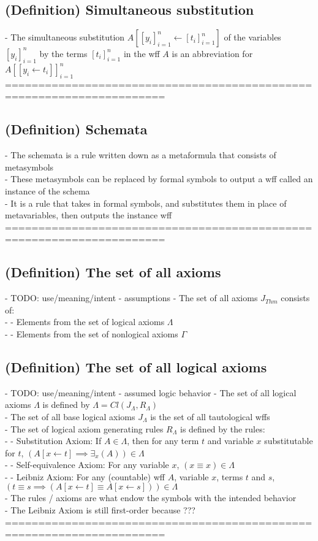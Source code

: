 \documentclass{article}
\begin{document}
\subsection{(Definition) Simultaneous substitution}
	- The simultaneous substitution $A[[y_i]_{i=1}^n \leftarrow [t_i]_{i=1}^n]$ of the variables $[y_i]_{i=1}^n$ by the terms $[t_i]_{i=1}^n$ in the wff $A$ is an abbreviation for $A[[y_i \leftarrow t_i]]_{i=1}^n$ \\
	======================================================================
\subsection{(Definition) Schemata}
	- The schemata is a rule written down as a metaformula that consists of metasymbols \\
	- These metasymbols can be replaced by formal symbols to output a wff called an instance of the schema \\
		- It is a rule that takes in formal symbols, and substitutes them in place of metavariables, then outputs the instance wff \\
	======================================================================
\subsection{(Definition) The set of all axioms}
	- TODO: use/meaning/intent - assumptions
	- The set of all axioms $J_{Thm}$ consists of: \\
		- - Elements from the set of logical axioms $\Lambda$ \\
		- - Elements from the set of nonlogical axioms $\Gamma$ \\
\subsection{(Definition) The set of all logical axioms}
	- TODO: use/meaning/intent - assumed logic behavior
	- The set of all logical axioms $\Lambda$ is defined by $\Lambda = Cl(J_\Lambda, R_\Lambda)$ \\
	- The set of all base logical axioms $J_\Lambda$ is the set of all tautological wffs \\
	- The set of logical axiom generating rules $R_\Lambda$ is defined by the rules: \\
		- - Substitution Axiom: If $A \in \Lambda$, then for any term $t$ and variable $x$ substitutable for $t$, $(A[x \leftarrow t] \implies \exists_x(A)) \in \Lambda$ \\
		- - Self-equivalence Axiom: For any variable $x$, $(x \equiv x) \in \Lambda$ \\
		- - Leibniz Axiom: For any (countable) wff $A$, variable $x$, terms $t$ and $s$, $(t \equiv s \implies (A[x \leftarrow t] \equiv A[x \leftarrow s])) \in \Lambda$ \\
	- The rules / axioms are what endow the symbols with the intended behavior \\ %
	- The Leibniz Axiom is still first-order because ??? %
	======================================================================
\end{document}
